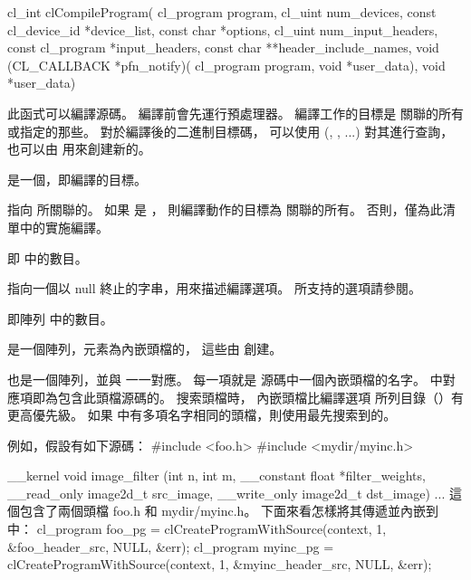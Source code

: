 
\startCLFUNC
cl_int clCompileProgram(
		cl_program program,
		cl_uint num_devices,
		const cl_device_id *device_list,
		const char *options,
		cl_uint num_input_headers,
		const cl_program *input_headers,
		const char **header_include_names,
		void (CL_CALLBACK *pfn_notify)(
				cl_program program,
				void *user_data),
		void *user_data)
\stopCLFUNC

此函式可以編譯源碼。
編譯前會先運行預處理器。
編譯工作的目標是
 關聯的所有或指定的那些。
對於編譯後的二進制目標碼，
可以使用 (, , ...) 對其進行查詢，
也可以由  用來創建新的。

 是一個，即編譯的目標。

 指向  所關聯的。
如果  是 ，
則編譯動作的目標為  關聯的所有。
否則，僅為此清單中的實施編譯。

 即  中的數目。

 指向一個以 null 終止的字串，用來描述編譯選項。
所支持的選項請參閱\insection[compilerOption]。

 即陣列  中的數目。

 是一個陣列，元素為內嵌頭檔的，
這些由  創建。

 也是一個陣列，並與  一一對應。
每一項就是  源碼中一個內嵌頭檔的名字。
 中對應項即為包含此頭檔源碼的。
搜索頭檔時，
內嵌頭檔比編譯選項  所列目錄（\insection[preprocessorOption]）有更高優先級。
如果  中有多項名字相同的頭檔，則使用最先搜索到的。

例如，假設有如下源碼：
\startclc[indentnext=no]
#include <foo.h>
#include <mydir/myinc.h>

__kernel void image_filter (int n, int m,
			__constant float *filter_weights,
			__read_only image2d_t src_image,
			__write_only image2d_t dst_image)
{
	...
}
\stopclc
這個包含了兩個頭檔 foo.h 和 mydir/myinc.h。
下面來看怎樣將其傳遞並內嵌到中：
\startclc
cl_program foo_pg = clCreateProgramWithSource(context,
				1, &foo_header_src, NULL, &err);
cl_program myinc_pg = clCreateProgramWithSource(context,
				1, &myinc_header_src, NULL, &err);

